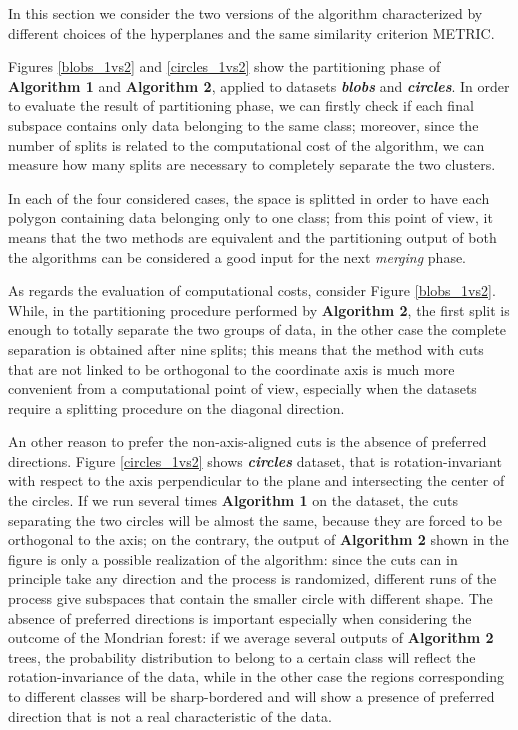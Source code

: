 \documentclass[a4paper]{article}
\begin{document}
In this section we consider the two versions of the algorithm characterized by different choices of the hyperplanes and the same similarity criterion METRIC.

Figures \ref{blobs_1vs2} and \ref{circles_1vs2} show the partitioning phase of \textbf{Algorithm 1} and \textbf{Algorithm 2}, applied to datasets \emph{\textbf{blobs}} and \emph{\textbf{circles}}.
In order to evaluate the result of partitioning phase, we can firstly check if each final subspace contains only data belonging to the same class;
moreover, since the number of splits is related to the computational cost of the algorithm, we can measure how many splits are necessary to completely separate the two clusters.

In each of the four considered cases, the space is splitted in order to have each polygon containing data belonging only to one class;
from this point of view, it means that the two methods are equivalent and the partitioning output of both the algorithms can be considered a good input for the next \emph{merging} phase.

As regards the evaluation of computational costs, consider Figure \ref{blobs_1vs2}.
While, in the partitioning procedure performed by \textbf{Algorithm 2}, the first split is enough to totally separate the two groups of data, in the other case the complete separation is obtained after nine splits;
this means that the method with cuts that are not linked to be orthogonal to the coordinate axis is much more convenient from a computational point of view, especially when the datasets require a splitting procedure on the diagonal direction.

An other reason to prefer the non-axis-aligned cuts is the absence of preferred directions.
Figure \ref{circles_1vs2} shows \emph{\textbf{circles}} dataset, that is rotation-invariant with respect to the axis perpendicular to the plane and intersecting the center of the circles.
If we run several times \textbf{Algorithm 1} on the dataset, the cuts separating the two circles will be almost the same, because they are forced to be orthogonal to the axis;
on the contrary, the output of \textbf{Algorithm 2} shown in the figure is only a possible realization of the algorithm:
since the cuts can in principle take any direction and the process is randomized, different runs of the process give subspaces that contain the smaller circle with different shape.
The absence of preferred directions is important especially when considering the outcome of the Mondrian forest:
if we average several outputs of \textbf{Algorithm 2} trees, the probability distribution to belong to a certain class will reflect the rotation-invariance of the data, while in the other case the regions corresponding to different classes will be sharp-bordered and will show a presence of preferred direction that is not a real characteristic of the data.
\end{document}
